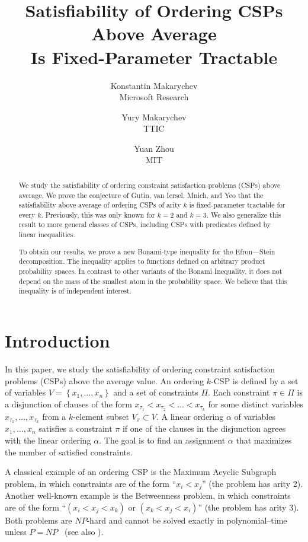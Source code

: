 \documentclass[11pt]{article}
\title{Satisfiability of Ordering CSPs Above Average\\ Is Fixed-Parameter Tractable}
\author{Konstantin Makarychev \\Microsoft Research \and Yury Makarychev
\\TTIC \and Yuan Zhou \\ MIT}
\date{}
\newcommand {\set}   [1] {\left\{ #1 \right\}}
\begin{document}
\maketitle

\begin{abstract}
We study the satisfiability of ordering constraint satisfaction problems (CSPs) above average. We prove the conjecture of Gutin, van Iersel, Mnich, and Yeo that the satisfiability above average of ordering CSPs of arity $k$ is fixed-parameter tractable for every $k$. Previously, this was only known for $k=2$ and $k=3$. We also generalize this result to more general classes of CSPs, including CSPs with predicates defined by linear inequalities.

To obtain our results, we prove a new Bonami-type inequality for the Efron---Stein decomposition. The inequality applies to functions defined on arbitrary product
probability  spaces. In contrast to other variants of the Bonami Inequality, it does not depend on the mass of the smallest atom in the probability space. We believe that this inequality is of independent interest.
\end{abstract}

\section{Introduction}

In this paper, we study the satisfiability of ordering constraint satisfaction problems (CSPs) above the average value. An ordering $k$-CSP
is defined by a set of variables $V = \set{x_1,\dots, x_n}$ and a set of constraints $\Pi$. Each constraint $\pi\in \Pi$
is a disjunction of clauses of the form $x_{\tau_1} < x_{\tau_2} < \dots < x_{\tau_k}$ for some distinct variables $x_{\tau_1},\dots, x_{\tau_k}$
from a $k$-element subset $V_{\pi}\subset V$. A linear ordering $\alpha$ of variables $x_1,\dots, x_n$ satisfies a constraint $\pi$ if one of the clauses in the disjunction agrees with the linear ordering $\alpha$. The goal is to find an assignment $\alpha$ that maximizes the number of satisfied constraints.

A classical example of an ordering CSP is the Maximum Acyclic Subgraph problem,  in which constraints are of the form ``$x_i < x_j$'' (the problem has arity 2). Another well-known example is the Betweenness problem, in which constraints are of the form ``$(x_i < x_j <x_k)$ or $(x_k < x_j <x_i)$'' (the problem has arity 3). Both problems are $NP$-hard and cannot be solved exactly in polynomial--time unless $P = NP$~\cite{Karp72, Opatrny79} (see also \cite{Seymour,CS,M-betw}).
\end{document}
